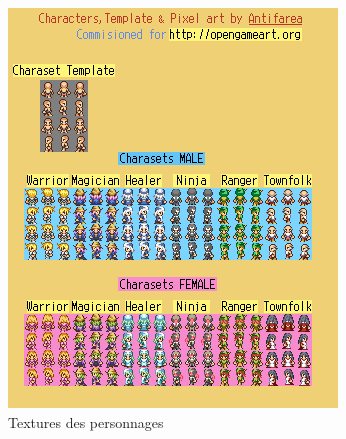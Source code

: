 \documentclass[a4paper,12pt]{article}
\begin{document}
\begin{figure}[hbt!]
    \centering
    \includegraphics[scale=0.9, angle=0]{images/texture_persos1.png}
    \caption{Textures des personnages}
    \label{fig:textPerso}
\end{figure}
\end{document}
